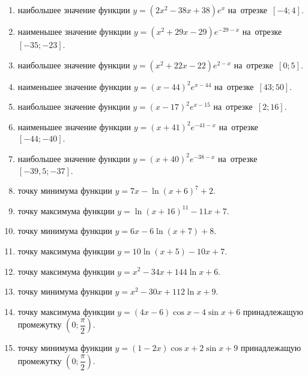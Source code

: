 \documentclass[a4paper,10pt]{article}
\begin{document}
\begin{enumerate}
\item {} наибольшее значение функции $y=\left(2x^2 -38x +38\right)e^{x}$ на~отрезке~$\left[-4;4\right]$.

\item {} наименьшее значение функции $y=\left(x^2 +29x -29\right)e^{-29-x}$ на~отрезке~$\left[-35;-23\right]$.

\item {} наибольшее значение функции $y=\left(x^2 +22x -22\right)e^{2-x}$ на~отрезке~$\left[0;5\right]$.

\item {} наименьшее значение функции $y=\left(x-44\right)^2e^{x-44}$ на~отрезке~$\left[43;50\right]$.

\item {} наибольшее значение функции $y=\left(x-17\right)^2e^{x-15}$ на~отрезке~$\left[2;16\right]$.

\item {} наименьшее значение функции $y=\left(x+41\right)^2e^{-41-x}$ на~отрезке~$\left[-44;-40\right]$.

\item {} наибольшее значение функции $y=\left(x+40\right)^2e^{-38-x}$ на~отрезке~$\left[-39,5;-37\right]$.

\item {} точку минимума функции $y=7x-\ln\left(x+6\right)^{7}+2$.

\item {} точку максимума функции $y=\ln\left(x+16\right)^{11}-11x+7$.

\item {} точку минимума функции $y=6x-6\ln\left(x+7\right)+8$.

\item {} точку максимума функции $y=10\ln\left(x+5\right)-10x+7$.

\item {} точку максимума функции $y=x^2-34x+144\ln x +6$.

\item {} точку минимума функции $y=x^2-30x+112\ln x +9$.

\item {} точку максимума функции $y=\left(4x-6\right)\cos x -4\sin x+6$
принадлежащую промежутку $\left(0;\dfrac{\pi}{2}\right)$.

\item {} точку минимума функции $y=\left(1-2x\right)\cos x +2\sin x+9$
принадлежащую промежутку $\left(0;\dfrac{\pi}{2}\right)$.


\end{enumerate}
\end{document}
